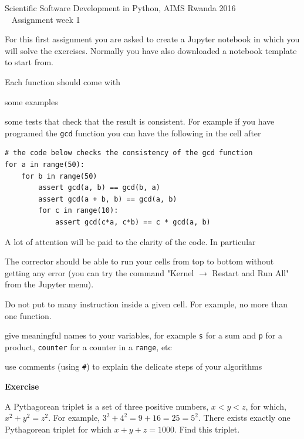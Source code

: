 \documentclass{article}
\newcounter{exo}
\newenvironment{exercise}%
{\par\vspace{.5\baselineskip}\noindent
\refstepcounter{exo}%
\textbf{Exercise \theexo}%
\par\vspace{.5\baselineskip}\noindent\ignorespaces
\begin{center}\begin{minipage}{0.9\linewidth}}%
{\end{minipage}\end{center}\smallskip}
\begin{document}
\pagestyle{empty}

\begin{center}
\Large Scientific Software Development in Python, AIMS Rwanda 2016 \\ \smallskip
Assignment week 1
\end{center}

For this first assignment you are asked to create a Jupyter notebook in which
you will solve the exercises. Normally you have also downloaded a notebook
template to start from.

Each function should come with
\begin{compactitem}
\item some examples
\item some tests that check that the result is consistent. For example if you have
programed the \texttt{gcd} function you can have the following in the cell after
\begin{verbatim}
# the code below checks the consistency of the gcd function
for a in range(50):
    for b in range(50)
        assert gcd(a, b) == gcd(b, a)
        assert gcd(a + b, b) == gcd(a, b)
        for c in range(10):
            assert gcd(c*a, c*b) == c * gcd(a, b)
\end{verbatim}
\end{compactitem}

\noindent A lot of attention will be paid to the clarity of the code. In particular
\begin{compactitem}
\item The corrector should be able to run your cells from top to bottom
without getting any error (you can try the command "Kernel $\to$ Restart and Run All"
from the Jupyter menu).
\item Do not put to many instruction inside a given cell. For example,
no more than one function.
\item give meaningful names to your variables, for example \texttt{s} for a
sum and \texttt{p} for a product, \texttt{counter} for a counter in
a \texttt{range}, etc
\item use comments (using \texttt{\#}) to explain the delicate steps
of your algorithms
\end{compactitem}


\begin{exercise}
A Pythagorean triplet is a set of three positive numbers, $x < y < z$, for which,
$x^2 + y^2 = z^2$. For example, $3^2 + 4^2 = 9 + 16 = 25 = 5^2$. There exists
exactly one Pythagorean triplet for which $x + y + z = 1000$. Find this triplet.
\end{exercise}
\end{document}
